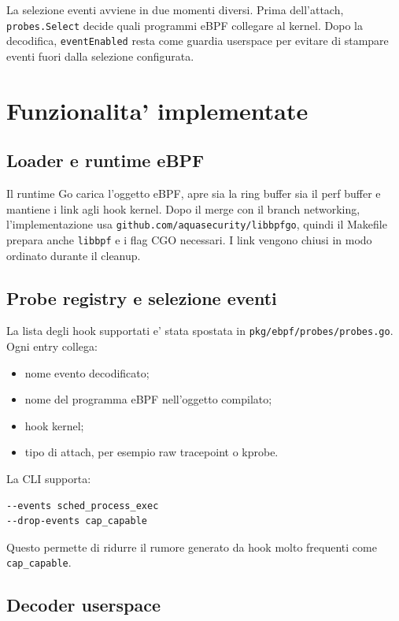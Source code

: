 \documentclass[11pt,a4paper]{article}
\begin{document}
La selezione eventi avviene in due momenti diversi. Prima dell'attach,
\texttt{probes.Select} decide quali programmi eBPF collegare al kernel. Dopo la
decodifica, \texttt{eventEnabled} resta come guardia userspace per evitare di
stampare eventi fuori dalla selezione configurata.

\section{Funzionalita' implementate}

\subsection{Loader e runtime eBPF}

Il runtime Go carica l'oggetto eBPF, apre sia la ring buffer sia il perf buffer
e mantiene i link agli hook kernel. Dopo il merge con il branch networking,
l'implementazione usa \texttt{github.com/aquasecurity/libbpfgo}, quindi il
Makefile prepara anche \texttt{libbpf} e i flag CGO necessari. I link vengono
chiusi in modo ordinato durante il cleanup.

\subsection{Probe registry e selezione eventi}

La lista degli hook supportati e' stata spostata in
\texttt{pkg/ebpf/probes/probes.go}. Ogni entry collega:

\begin{itemize}
  \item nome evento decodificato;
  \item nome del programma eBPF nell'oggetto compilato;
  \item hook kernel;
  \item tipo di attach, per esempio raw tracepoint o kprobe.
\end{itemize}

La CLI supporta:

\begin{lstlisting}[style=terminal]
--events sched_process_exec
--drop-events cap_capable
\end{lstlisting}

Questo permette di ridurre il rumore generato da hook molto frequenti come
\texttt{cap\_capable}.

\subsection{Decoder userspace}
\end{document}
